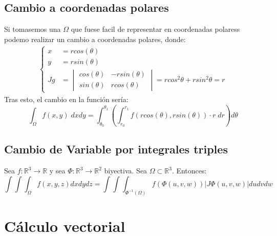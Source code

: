\documentclass[11pt]{article}
\newcommand{\R}{\mathbb{R}}
\theoremstyle{plain}
\begin{document}
    \subsection{Cambio a coordenadas polares} %
    \label{sub:cambio_a_coordenadas_polares}
        Si tomasemos una $\Omega$ que fuese facil de representar en coordenadas polaress podemo realizar un cambio a coordenadas polares, donde:
        \begin{align}
            \begin{cases}
              x &= rcos(\theta)\\
              y &= rsin(\theta)\\
              Jg &= 
              \begin{vmatrix}
                  cos(\theta)&-rsin(\theta)\\
                  sin(\theta)&rcos(\theta)
              \end{vmatrix} = rcos^2\theta + r sin^2\theta =  r 
            \end{cases} 
        \end{align}
        Tras esto, el cambio en la función sería:
        \[\int_\Omega f(x,y) \; dxdy =\int_{\theta_0}^{\theta_1}\left(\int_{r_0}^{r_1} f(rcos(\theta),rsin(\theta)) \cdot r \; dr\right) d\theta \]
    \subsection{Cambio de Variable por integrales triples} %
    \label{sub:cambio_de_variable_por_integrales_triples}
        Sea $f:\R^3 \rightarrow \R$ y sea $\Phi:\R^3\rightarrow\R^2$ biyectiva. Sea $\Omega \subset \R^3$. Entonces:
        \[\int\int\int_{\Omega} f(x,y,z) dxdydz = \int \int \int_{\Phi^{-1}(\Omega)}f(\Phi(u,v,w))|J\Phi(u,v,w)| dudvdw  \]
    \section{Cálculo vectorial} %
    \label{sec:cálculo_vectorial}
\end{document}
